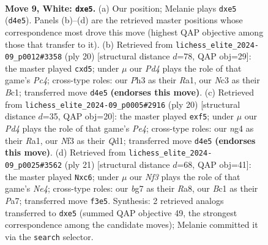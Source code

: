 \documentclass[11pt]{article}
\begin{document}
\clearpage

\begin{figure}[p]\centering
\begin{subfigure}{0.46\textwidth}\centering
\resizebox{\linewidth}{!}{%
\newchessgame
\chessboard[
  setfen={rnbq1rk1/ppp3bp/3p1pp1/4p3/2PPP1n1/2N2N1P/PP2BPP1/1RBQK2R w K - 0 9},
  showmover=false,
  pgfstyle=straightmove, color=movearrow, markmove={d4-e5}
]}
\caption{}
\end{subfigure}\hfill
\begin{subfigure}{0.46\textwidth}\centering
\resizebox{\linewidth}{!}{%
\newchessgame
\chessboard[
  setfen={r1bq1rk1/pp4pp/n1p1pn2/b2p1p2/2PP4/1PNBP3/4NPPP/R1BQ1RK1 w - - 0 11},
  showmover=false,
  pgfstyle=straightmove, color=movearrow, markmove={c4-d5}
]}
\caption{}
\end{subfigure}
\\[4pt]
\begin{subfigure}{0.46\textwidth}\centering
\resizebox{\linewidth}{!}{%
\newchessgame
\chessboard[
  setfen={rnbq1rk1/1pp3b1/3p2pp/p2Ppp2/2P1P1n1/2N2N2/PP1BBPPP/R2QK2R w KQ - 0 11},
  showmover=false,
  pgfstyle=straightmove, color=movearrow, markmove={e4-f5}
]}
\caption{}
\end{subfigure}\hfill
\begin{subfigure}{0.46\textwidth}\centering
\resizebox{\linewidth}{!}{%
\newchessgame
\chessboard[
  setfen={r2qk2r/pp1bppb1/2Pp1np1/4n2p/2PN4/1P4PP/P3PPB1/RNBQ1RK1 b kq - 0 11},
  showmover=false,
  pgfstyle=straightmove, color=movearrow, markmove={e5-c6}
]}
\caption{}
\end{subfigure}
\caption{\textbf{Move 9, White: \texttt{dxe5}.} (a) Our position; Melanie plays \texttt{dxe5} (\texttt{d4e5}). Panels (b)--(d) are the retrieved master positions whose correspondence most drove this move (highest QAP objective among those that transfer to it). (b) Retrieved from \texttt{lichess\_elite\_2024-09\_p0012\#3358} (ply 20) [structural distance $d$=78, QAP obj=29]: the master played \texttt{cxd5}; under $\mu$ our \emph{Pd4} plays the role of that game's \emph{Pc4}; cross-type roles: our \emph{P}h3 as their \emph{R}a1, our \emph{N}c3 as their \emph{B}c1; transferred move \texttt{d4e5} \textbf{(endorses this move)}. (c) Retrieved from \texttt{lichess\_elite\_2024-09\_p0005\#2916} (ply 20) [structural distance $d$=35, QAP obj=20]: the master played \texttt{exf5}; under $\mu$ our \emph{Pd4} plays the role of that game's \emph{Pe4}; cross-type roles: our \emph{n}g4 as their \emph{R}a1, our \emph{N}f3 as their \emph{Q}d1; transferred move \texttt{d4e5} \textbf{(endorses this move)}. (d) Retrieved from \texttt{lichess\_elite\_2024-09\_p0025\#3562} (ply 21) [structural distance $d$=68, QAP obj=41]: the master played \texttt{Nxc6}; under $\mu$ our \emph{Nf3} plays the role of that game's \emph{Ne4}; cross-type roles: our \emph{b}g7 as their \emph{R}a8, our \emph{B}c1 as their \emph{P}a7; transferred move \texttt{f3e5}. Synthesis: 2 retrieved analogs transferred to \texttt{dxe5} (summed QAP objective 49, the strongest correspondence among the candidate moves); Melanie committed it via the \texttt{search} selector.}
\label{fig:thought-m16}
\end{figure}
\end{document}
